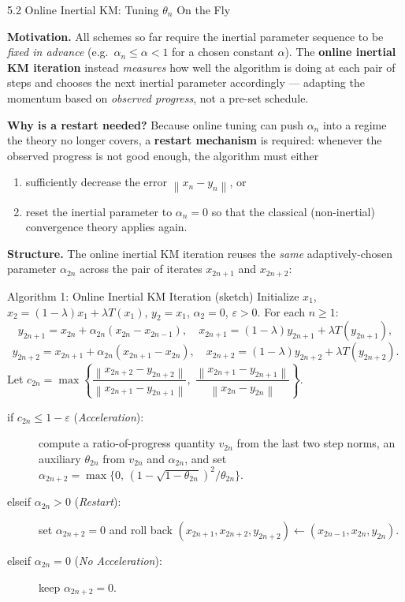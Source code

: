 \documentclass[aspectratio=169,10pt]{beamer}
\newcommand{\norm}[1]{\left\|#1\right\|}
\begin{document}
\begin{frame}[allowframebreaks]{5.2 Online Inertial KM: Tuning $\theta_n$ On the Fly}

  \textbf{Motivation.}  All schemes so far require the inertial
  parameter sequence to be \emph{fixed in advance} (e.g.\
  $\alpha_n\le\alpha<1$ for a chosen constant $\alpha$). The
  \textbf{online inertial KM iteration} instead \emph{measures} how
  well the algorithm is doing at each pair of steps and chooses the
  next inertial parameter accordingly --- adapting the momentum
  based on \emph{observed progress}, not a pre-set schedule.

  \vspace{0.5em}
  \textbf{Why is a restart needed?}  Because online tuning can
  push $\alpha_n$ into a regime the theory no longer covers, a
  \textbf{restart mechanism} is required: whenever the observed
  progress is not good enough, the algorithm must either
  \begin{enumerate}
    \item sufficiently decrease the error $\norm{x_n-y_n}$, or
    \item reset the inertial parameter to $\alpha_n=0$ so that the
          classical (non-inertial) convergence theory applies
          again.
  \end{enumerate}

  \framebreak

  \textbf{Structure.}  The online inertial KM iteration reuses the
  \emph{same} adaptively-chosen parameter $\alpha_{2n}$ across the
  pair of iterates $x_{2n+1}$ and $x_{2n+2}$:

  \begin{block}{Algorithm 1: Online Inertial KM Iteration (sketch)}
    \footnotesize
    Initialize $x_1$, $x_2=(1-\lambda)x_1+\lambda T(x_1)$,
    $y_2=x_1$, $\alpha_2=0$, $\varepsilon>0$. For each $n\ge1$:
    \[
      y_{2n+1}=x_{2n}+\alpha_{2n}(x_{2n}-x_{2n-1}), \quad
      x_{2n+1}=(1-\lambda)y_{2n+1}+\lambda T(y_{2n+1}),
    \]
    \[
      y_{2n+2}=x_{2n+1}+\alpha_{2n}(x_{2n+1}-x_{2n}), \quad
      x_{2n+2}=(1-\lambda)y_{2n+2}+\lambda T(y_{2n+2}).
    \]
    Let $c_{2n}=\max\!\left\{
      \dfrac{\norm{x_{2n+2}-y_{2n+2}}}{\norm{x_{2n+1}-y_{2n+1}}},\;
      \dfrac{\norm{x_{2n+1}-y_{2n+1}}}{\norm{x_{2n}-y_{2n}}}\right\}$.
    \begin{description}
      \item[if $c_{2n}\le1-\varepsilon$ (\emph{Acceleration}):]
        compute a ratio-of-progress quantity $v_{2n}$ from the last
        two step norms, an auxiliary $\theta_{2n}$ from $v_{2n}$
        and $\alpha_{2n}$, and set
        $\alpha_{2n+2}=\max\{0,\,(1-\sqrt{1-\theta_{2n}})^2/\theta_{2n}\}$.
      \item[elseif $\alpha_{2n}>0$ (\emph{Restart}):]
        set $\alpha_{2n+2}=0$ and roll back
        $(x_{2n+1},x_{2n+2},y_{2n+2})\leftarrow(x_{2n-1},x_{2n},y_{2n})$.
      \item[elseif $\alpha_{2n}=0$ (\emph{No Acceleration}):]
        keep $\alpha_{2n+2}=0$.
    \end{description}
  \end{block}


\end{frame}
\end{document}
